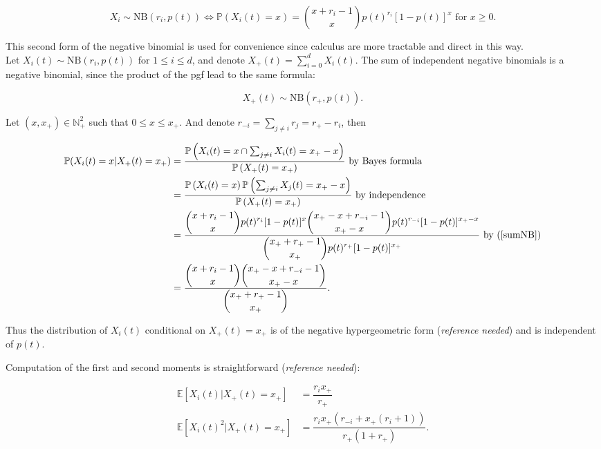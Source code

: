 \documentclass{article}
\newcommand{\pr}{{\mathbb{P}}}
\begin{document}
\begin{equation}
X_i \sim \mathrm{NB}(r_i,p(t)) \iff \pr(X_i(t)=x)=\binom{x+r_i-1}{x} p(t)^{r_i} [1-p(t)]^{x} \text{ for } x \geq 0.
\end{equation}

This second form of the negative binomial is used for convenience since calculus are more tractable and direct in this way.\\


Let $X_i(t) \sim \mathrm{NB}(r_i,p(t))$ for $1 \leq i \leq d$, and denote $X_+(t)=\sum_{i=0}^d X_i(t)$. The sum of independent negative binomials is a negative binomial, since the product of the pgf lead to the same formula:

\begin{equation}
 X_+(t)  \sim \mathrm{NB} \left( r_+, p(t) \right). \label{sumNB}
\end{equation}


Let $(x,x_+) \in \mathbb{N}_+^2$ such that $0 \leq x \leq x_+$. And denote $ \displaystyle r_{-i}=\sum_{j \neq i} r_j=r_+-r_i$, then

\begin{align}
\pr( X_i(t)=x \vert X_+(t)=x_+ ) &=\dfrac{\pr\left( X_i(t)=x \cap \sum_{j \neq i} X_i(t)=x_+-x \right)}{\pr\left(X_+(t)=x_+\right)} \text{ by Bayes formula}\\
 &=\dfrac{\pr\left(X_i(t)=x\right) \pr\left(\sum_{j \neq i} X_j(t)=x_+-x\right)}{\pr\left(X_+(t)=x_+\right)} \text{ by independence}\\
 &=\dfrac{\displaystyle \binom{x+r_i-1}{x} p(t)^{r_i} [1-p(t)]^{x} \binom{x_+-x+r_{-i}-1}{x_+-x} p(t)^{r_{-i}} [1-p(t)]^{x_+-x} }{\displaystyle \binom{x_++r_+ -1}{x_+} p(t)^{r_+ } [1-p(t)]^{x_+}} \text{ by }(\eqref{sumNB}) \\
 &=\dfrac{\displaystyle \binom{x+r_i-1}{x} \binom{x_+-x+r_{-i}-1}{x_+-x}}{\displaystyle \binom{x_+ +r_+ -1}{x_+}}.
\end{align}
 
 Thus the distribution of $X_i(t)$ conditional on $ X_+(t)=x_+$ is of the negative hypergeometric form (\textit{reference needed}) and is independent of $p(t)$.
 
 Computation of the first and second moments is straightforward (\textit{reference needed}): 
 
\begin{align}
\mathbb{E} [ X_i(t) \vert X_+(t)=x_+ ] &=\dfrac{r_i x_+}{r_+ } \\
\mathbb{E} [ X_i(t)^2 \vert X_+(t)=x_+ ] &=\dfrac{r_i x_+ (r_{-i} +x_+ (r_i+1))}{r_+ (1+r_+ )}.
\end{align}
\end{document}
